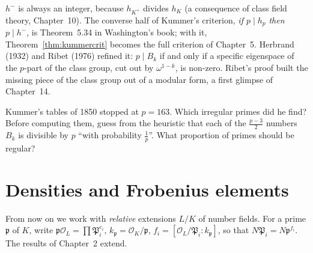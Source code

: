 \begin{remark}
$h^-$ is always an integer, because $h_{K^+}$ divides $h_K$ (a consequence of class field theory, Chapter~10). The converse half of Kummer's
criterion, \emph{if $p\mid h_p$ then $p\mid h^-$}, is Theorem~5.34 in Washington's book; with it, Theorem~\ref{thm:kummercrit} becomes the full
criterion of Chapter~5. Herbrand (1932) and Ribet (1976) refined it: $p\mid B_k$ if and only if a specific eigenspace of the $p$-part of the
class group, cut out by $\omega^{1-k}$, is non-zero. Ribet's proof built the missing piece of the class group out of a modular form, a first
glimpse of Chapter~14.
\end{remark}

\begin{think}
Kummer's tables of 1850 stopped at $p=163$. Which irregular primes did he find? Before computing them, guess from the heuristic that
each of the $\frac{p-3}2$ numbers $B_k$ is divisible by $p$ ``with probability $\frac1p$''. What proportion of primes should be regular?
\end{think}

\section{Densities and Frobenius elements}

From now on we work with \emph{relative} extensions $L/K$ of number fields. For a prime $\mathfrak p$ of $K$, write $\mathfrak p\mathcal O_L=
\prod\mathfrak P_i^{e_i}$, $k_{\mathfrak p}=\mathcal O_K/\mathfrak p$, $f_i=[\mathcal O_L/\mathfrak P_i:k_{\mathfrak p}]$, so that $N\mathfrak P_i=
N\mathfrak p^{f_i}$. The results of Chapter~2 extend.

